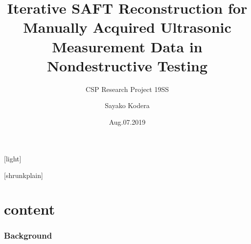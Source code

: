 \documentclass[14pt,compress,aspectratio=169]{beamer} %
\title{Iterative SAFT Reconstruction for Manually Acquired Ultrasonic Measurement Data in Nondestructive Testing}
\subtitle{CSP Research Project 19SS}
\institute{\foreignlanguage{german}{Technische Universität Ilmenau}}
\author{Sayako Kodera}
\date{Aug.07.2019}
\begin{document}
[light]
\begin{frame}[noframenumbering] %
 	\titlepage
\end{frame}

[shrunkplain]

\part{content}

\section{Background}
\end{document}
